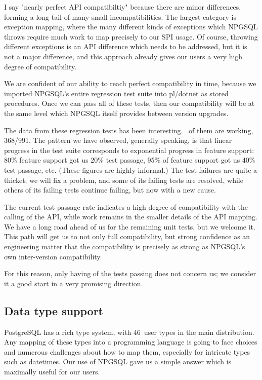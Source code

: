\documentclass[sigconf,techreport,authorversion,nonacm]{acmart}
\newcommand{\psqltypecount}{46}
\newcommand{\npgsqlcount}{991}
\newcommand{\npgsqlpassing}{368}
\begin{document}
I say "nearly perfect API compatibiltiy" because there are minor
differences, forming a long tail of many small incompatibilities.  The
largest category is exception mapping, where the many different kinds of
exceptions which NPGSQL throws require much work to map precisely to our
SPI usage.  Of course, throwing different exceptions is an API difference
which needs to be addressed, but it is not a major difference, and this
approach already gives our users a very high degree of compatibility.

We are confident of our ability to reach perfect compatibility
in time, because we imported NPGSQL's entire regression test
suite into pl/dotnet as stored procedures.  Once we can pass
all of these tests, then our compatibility will be at the same
level which NPGSQL itself provides between version upgrades.

The data from these regression tests has been interesting.
\npgsqlpercentage\, of them are working, \npgsqlpassing/\npgsqlcount.
The pattern we have observed, generally speaking, is that linear progress
in the test suite corresponds to exponential progress in feature support:
80\% feature support got us 20\% test passage, 95\% of feature support
got us 40\% test passage, etc.  (These figures are highly informal.)
The test failures are quite a thicket; we will fix a problem, and some
of its failing tests are resolved, while others of its failing tests
continue failing, but now with a new cause.

The current test passage rate indicates a high degree of compatibility
with the calling of the API, while work remains in the smaller
details of the API mapping.  We have a long road ahead of us for the
remaining unit tests, but we welcome it.  This path will get us to
not only full compatibility, but strong confidence as an engineering
matter that the compatibility is precisely as strong as NPGSQL's own
inter-version compatibility.

For this reason, only having \npgsqlpercentage of the tests passing
does not concern us; we consider it a good start in a very promising
direction.

\subsection{Data type support}

PostgreSQL has a rich type system, with \psqltypecount\ user types in
the main distribution. Any mapping of these types into a programming
language is going to face choices and numerous challenges about how to
map them, especially for intricate types such as datetimes.  Our use of
NPGSQL gave us a simple answer which is maximally useful for our users.
\end{document}
